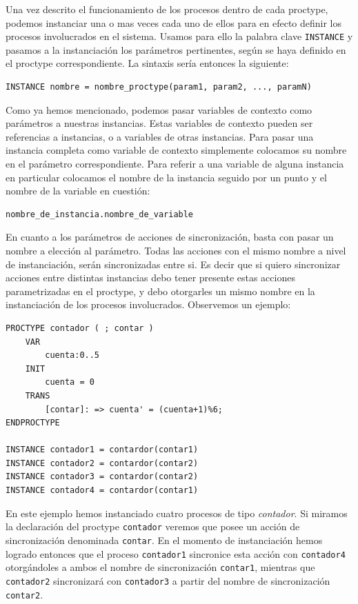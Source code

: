 \documentclass[pdftex,a4paper,12pt]{book}
\begin{document}
Una vez descrito el funcionamiento de los procesos dentro de cada proctype, podemos instanciar una o mas veces cada uno de ellos para en efecto definir los procesos involucrados en el sistema. Usamos para ello la palabra clave \texttt{INSTANCE} y pasamos a la instanciaci\'on los par\'ametros pertinentes, seg\'un se haya definido en el proctype correspondiente. La sintaxis ser\'ia entonces la siguiente: 
\begin{verbatim}
INSTANCE nombre = nombre_proctype(param1, param2, ..., paramN)
\end{verbatim}
Como ya hemos mencionado, podemos pasar variables de contexto como par\'ametros a nuestras instancias. Estas variables de contexto pueden ser referencias a instancias, o a variables de otras instancias. Para pasar una instancia completa como variable de contexto simplemente colocamos su nombre en el par\'ametro correspondiente. Para referir a una variable de alguna instancia en particular colocamos el nombre de la instancia seguido por un punto y el nombre de la variable en cuesti\'on:
\begin{verbatim}
nombre_de_instancia.nombre_de_variable
\end{verbatim}

En cuanto a los par\'ametros de acciones de sincronizaci\'on, basta con pasar un nombre a elecci\'on al par\'ametro. Todas las acciones con el mismo nombre a nivel de instanciaci\'on, ser\'an sincronizadas entre si. Es decir que si quiero sincronizar acciones entre distintas instancias debo tener presente estas acciones parametrizadas en el proctype, y debo otorgarles un mismo nombre en la instanciaci\'on de los procesos involucrados. Observemos un ejemplo:
\begin{verbatim}
PROCTYPE contador ( ; contar )
    VAR
        cuenta:0..5
    INIT
        cuenta = 0
    TRANS
        [contar]: => cuenta' = (cuenta+1)%6;
ENDPROCTYPE

INSTANCE contador1 = contardor(contar1)
INSTANCE contador2 = contardor(contar2)
INSTANCE contador3 = contardor(contar2)
INSTANCE contador4 = contardor(contar1)
\end{verbatim}

En este ejemplo hemos instanciado cuatro procesos de tipo \textit{contador}. Si miramos la declaraci\'on del proctype \texttt{contador} veremos que posee un acci\'on de sincronizaci\'on denominada \texttt{contar}. En el momento de instanciaci\'on hemos logrado entonces que el proceso \texttt{contador1} sincronice esta acci\'on con \texttt{contador4} otorg\'andoles a ambos el nombre de sincronizaci\'on \texttt{contar1}, mientras que \texttt{contador2} sincronizar\'a con \texttt{contador3} a partir del nombre de sincronizaci\'on \texttt{contar2}.
\end{document}
